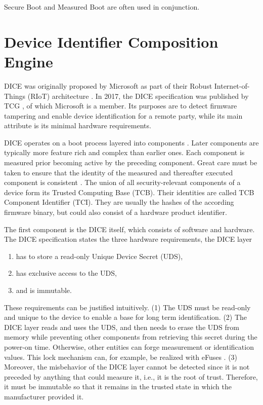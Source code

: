 Secure Boot and Measured Boot are often used in conjunction.

\section{Device Identifier Composition Engine}

\ac{DICE} was originally proposed by Microsoft as part of their Robust Internet-of-Things (RIoT) architecture \cite{England2016}. In 2017, the DICE specification was published by \ac{TCG} \cite{tcg-microsoft-tpm}, of which Microsoft is a member.
Its purposes are to detect firmware tampering and enable device identification for a remote party, while its main attribute is its minimal hardware requirements.


DICE operates on a boot process layered into components \cite{dice-layering-arch}.
Later components are typically more feature rich and complex than earlier ones.
Each component is measured prior becoming active by the preceding component.
Great care must be taken to ensure that the identity of the measured and thereafter executed component is consistent \cite{Hristozov2022, Carpent2018}.
The union of all security-relevant components of a device form its Trusted Computing Base (TCB).
Their identities are called TCB Component Identifier (TCI).
They are usually the hashes of the according firmware binary, but could also consist of a hardware product identifier.


The first component is the DICE itself, which consists of software and hardware. The DICE specification \cite{dice-hardware-reqs} states the three hardware requirements, the DICE layer 
\begin{enumerate}
  \item has to store a read-only Unique Device Secret (UDS),
  \item has exclusive access to the UDS,
  \item and is immutable.
\end{enumerate}
These requirements can be justified intuitively.
(1) The UDS must be read-only and unique to the device to enable a base for long term identification.
(2) The DICE layer reads and uses the UDS, and then needs to erase the UDS from memory while preventing other components from retrieving this secret during the power-on time.
Otherwise, other entities can forge measurement or identification values. This lock mechanism can, for example, be realized with eFuses \cite{dice-hardware-reqs}.
(3) Moreover, the misbehavior of the DICE layer cannot be detected since it is not preceded by anything that could measure it, i.e., it is the root of trust.
Therefore, it must be immutable so that it remains in the trusted state in which the manufacturer provided it.

